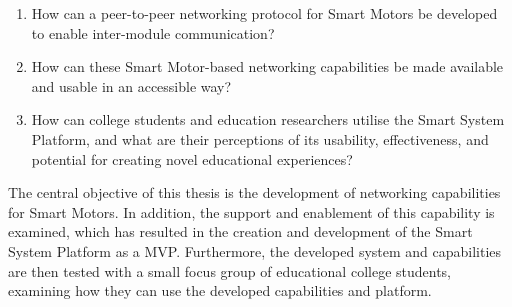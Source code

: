 \begin{enumerate}
    \item How can a peer-to-peer networking protocol for Smart Motors be developed to enable inter-module communication?
    \item How can these Smart Motor-based networking capabilities be made available and usable in an accessible way?
    \item How can college students and education researchers utilise the Smart System Platform, and what are their perceptions of its usability, effectiveness, and potential for creating novel educational experiences?

\end{enumerate}

The central objective of this thesis is the development of networking capabilities for Smart Motors. In addition, the support and enablement of this capability is examined, which has resulted in the creation and development of the Smart System Platform as a MVP. Furthermore, the developed system and capabilities are then tested with a small focus group of educational college students, examining how they can use the developed capabilities and platform. 



